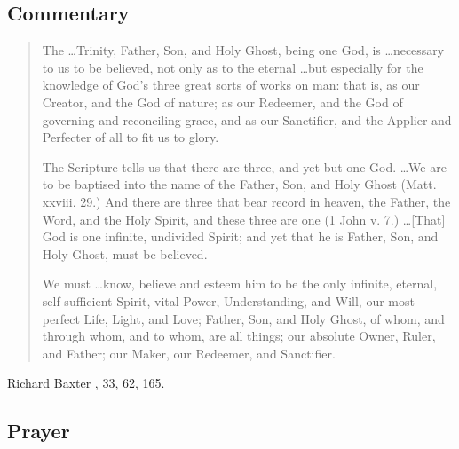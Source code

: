 \documentclass[00-main.tex]{subfiles}
\begin{document}

\subsection{Commentary}

\begin{quotation}
The \ldots Trinity, Father, Son, and Holy Ghost, being one God, is \ldots necessary to us to be believed, not only as to the eternal \ldots but especially for the knowledge of God's three great sorts of works on man: that is, as our Creator, and the God of nature; as our Redeemer, and the God of governing and reconciling grace, and as our Sanctifier, and the Applier and Perfecter of all to fit us to glory.

The Scripture tells us that there are three, and yet but one God. \ldots  We are to be baptised into the name of the Father, Son, and Holy Ghost (Matt. xxviii. 29.) And there are three that bear record in heaven, the Father, the Word, and the Holy Spirit, and these three are one (1 John v. 7.) \ldots  [That] God is one infinite, undivided Spirit; and yet that he is Father, Son, and Holy Ghost, must be believed.

We must \ldots know, believe and esteem him to be the only infinite, eternal, self-sufficient Spirit, vital Power, Understanding, and Will, our most perfect Life, Light, and Love; Father, Son, and Holy Ghost, of whom, and through whom, and to whom, are all things; our absolute Owner, Ruler, and Father; our Maker, our Redeemer, and Sanctifier.
\end{quotation}

\begin{flushright}
	Richard Baxter \cite{Baxter:1830}, 33, 62, 165. \label{baxter:q3}
\end{flushright}

\subsection{Prayer}
\end{document}
